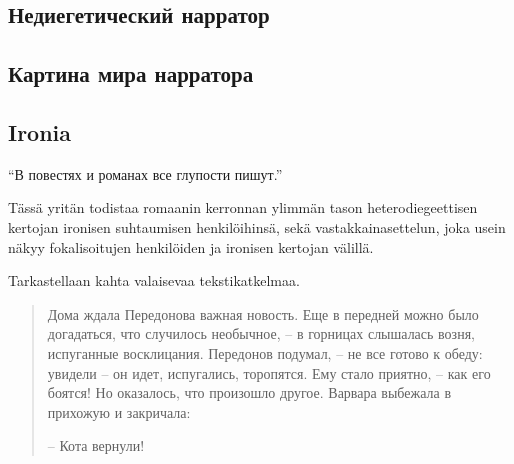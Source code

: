 \documentclass[12pt,a4paper]{article}
\begin{document}
\subsection{Недиегетический нарратор}
\subsection{Картина мира нарратора}


\subsection{Ironia}

\enquote{В повестях и романах все глупости пишут.} \parencite[54]{sologub2004}



Tässä yritän todistaa romaanin kerronnan ylimmän tason heterodiegeettisen kertojan ironisen suhtaumisen henkilöihinsä, sekä vastakkainasettelun, joka usein näkyy fokalisoitujen henkilöiden ja ironisen kertojan välillä.
% 
% 
% 
%

Tarkastellaan kahta valaisevaa tekstikatkelmaa.

\begin{quote}
Дома ждала Передонова важная новость. Еще в передней можно
было догадаться, что случилось необычное, – в горницах слышалась 
возня, испуганные восклицания. Передонов подумал, – не все
готово к обеду: увидели – он идет, испугались, торопятся. Ему стало
приятно, – как его боятся! Но оказалось, что произошло другое. 
Варвара выбежала в прихожую и закричала:

– Кота вернули!

\parencite[171.]{sologub2004}

\end{quote}
\end{document}
